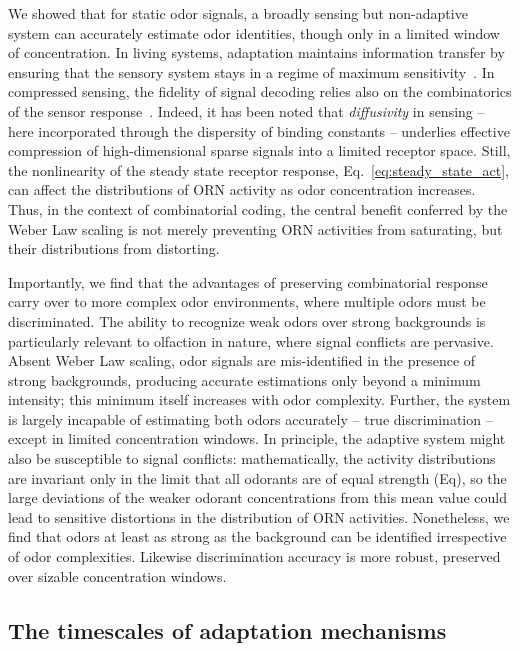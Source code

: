We showed that for static odor signals, a broadly sensing but non-adaptive system can accurately estimate odor identities, though only in a limited window of concentration. In living systems, adaptation maintains information transfer by ensuring that the sensory system stays in a regime of maximum sensitivity~\cite{information_theory_adaptation}. In compressed sensing, the fidelity of signal decoding relies also on the combinatorics of the sensor response~\cite{CS_tao, CS_donoho, CS_ganguli}. Indeed, it has been noted that \textit{diffusivity} in sensing -- here incorporated through the dispersity of binding constants -- underlies effective compression of high-dimensional sparse signals into a limited receptor space. Still, the nonlinearity of the steady state receptor response, Eq.~\ref{eq:steady_state_act}, can affect the distributions of ORN activity as odor concentration increases. Thus, in the context of combinatorial coding, the central benefit conferred by the Weber Law scaling is not merely preventing ORN activities from saturating, but their distributions from distorting. 

Importantly, we find that the advantages of preserving combinatorial response carry over to more complex odor environments, where multiple odors must be discriminated. The ability to recognize weak odors over strong backgrounds is particularly relevant to olfaction in nature, where signal conflicts are pervasive. Absent Weber Law scaling, odor signals are mis-identified in the presence of strong backgrounds, producing accurate estimations only beyond a minimum intensity; this minimum itself increases with odor complexity. Further, the system is largely incapable of estimating both odors accurately -- true discrimination -- except in limited concentration windows. In principle, the adaptive system might also be susceptible to signal conflicts: mathematically, the activity distributions are invariant only in the limit that all odorants are of equal strength (Eq), so the large deviations of the weaker odorant concentrations from this mean value could lead to sensitive distortions in the distribution of ORN activities. Nonetheless, we find that odors at least as strong as the background can be identified irrespective of odor complexities. Likewise discrimination accuracy is more robust, preserved over sizable concentration windows. 


\subsection{The timescales of adaptation mechanisms}

